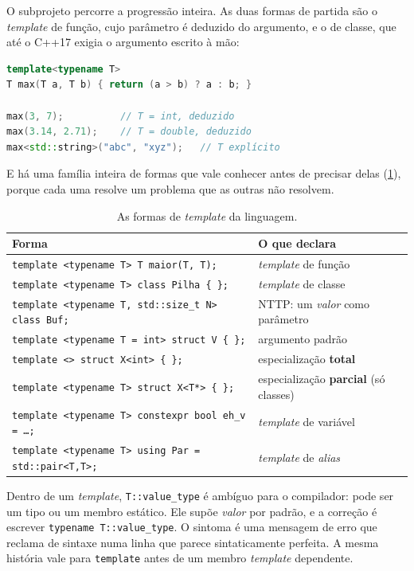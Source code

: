 O subprojeto  percorre a progressão inteira. As duas formas
de partida são o \emph{template} de função, cujo parâmetro é deduzido do
argumento, e o de classe, que até o C++17 exigia o argumento escrito à mão:

\begin{lstlisting}[style=bt, language=C++,
    caption={Dedução na função; CTAD, a partir do C++17, também na classe.}]
template<typename T>
T max(T a, T b) { return (a > b) ? a : b; }

max(3, 7);          // T = int, deduzido
max(3.14, 2.71);    // T = double, deduzido
max<std::string>("abc", "xyz");   // T explícito
\end{lstlisting}

E há uma família inteira de formas que vale conhecer antes de precisar delas
(\cref{tab:formas-template}), porque cada uma resolve um problema que as outras
não resolvem.

\begin{table}[htbp]
\centering
\caption{As formas de \emph{template} da linguagem.}
\label{tab:formas-template}
\footnotesize
\begin{tabular}{@{}ll@{}}
\toprule
\textbf{Forma} & \textbf{O que declara} \\
\midrule
\texttt{template <typename T> T maior(T, T);}            & \emph{template} de função \\
\texttt{template <typename T> class Pilha \{ \};}        & \emph{template} de classe \\
\texttt{template <typename T, std::size\_t N> class Buf;}& NTTP: um \emph{valor} como parâmetro \\
\texttt{template <typename T = int> struct V \{ \};}     & argumento padrão \\
\texttt{template <> struct X<int> \{ \};}                & especialização \textbf{total} \\
\texttt{template <typename T> struct X<T*> \{ \};}       & especialização \textbf{parcial} (só classes) \\
\texttt{template <typename T> constexpr bool eh\_v = …;} & \emph{template} de variável \\
\texttt{template <typename T> using Par = std::pair<T,T>;}& \emph{template} de \emph{alias} \\
\bottomrule
\end{tabular}
\end{table}

\begin{armadilha}
Dentro de um \emph{template}, \texttt{T::value\_type} é ambíguo para o
compilador: pode ser um tipo ou um membro estático. Ele supõe \emph{valor} por
padrão, e a correção é escrever \texttt{typename T::value\_type}. O sintoma é
uma mensagem de erro que reclama de sintaxe numa linha que parece
sintaticamente perfeita. A mesma história vale para \texttt{template} antes de
um membro \emph{template} dependente.
\end{armadilha}

